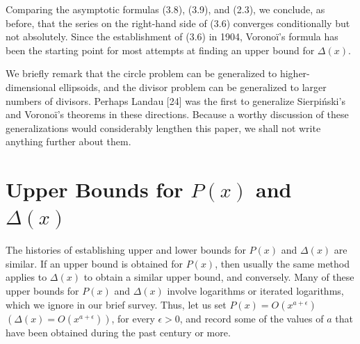 \documentclass[10pt]{article}
\theoremstyle{plain}
\begin{document}
Comparing the asymptotic formulas (3.8), (3.9), and (2.3), we conclude, as before, that the series on the right-hand side of (3.6) converges conditionally but not absolutely. Since the establishment of (3.6) in 1904, Voronoï's formula has been the starting point for most attempts at finding an upper bound for $\Delta(x)$.

We briefly remark that the circle problem can be generalized to higher-dimensional ellipsoids, and the divisor problem can be generalized to larger numbers of divisors. Perhaps Landau [24] was the first to generalize Sierpiński's and Voronoï's theorems in these directions. Because a worthy discussion of these generalizations would considerably lengthen this paper, we shall not write anything further about them.

\section{Upper Bounds for \texorpdfstring{$P(x)$ and $\Delta(x)$}{P(x) and Delta(x)}}

The histories of establishing upper and lower bounds for $P(x)$ and $\Delta(x)$ are similar. If an upper bound is obtained for $P(x)$, then usually the same method applies to $\Delta(x)$ to obtain a similar upper bound, and conversely. Many of these upper bounds for $P(x)$ and $\Delta(x)$ involve logarithms or iterated logarithms, which we ignore in our brief survey. Thus, let us set $P(x)=O\left(x^{a+\epsilon}\right)$ $\left(\Delta(x)=O\left(x^{a+\epsilon}\right)\right)$, for every $\epsilon>0$, and record some of the values of $a$ that have been obtained during the past century or more.
\end{document}
